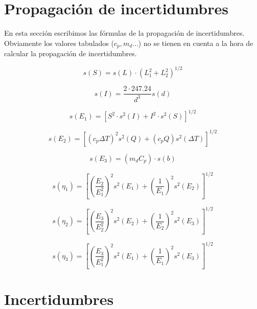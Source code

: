\documentclass[12pt,a4paper]{article}
\newcommand{\parentesis}[1]{\left( #1  \right)}
\newcommand{\ccorchetes}[1]{\left[ #1  \right]}
\begin{document}
\section{Propagación de incertidumbres}
En esta sección escribimos las fórmulas de la propagación de incertidumbres.  Obviamente los valores tabulados ($c_p,m_{d}\ldots$) no se tienen en cuenta a la hora de calcular la propagación de incertidumbres.

\begin{equation}
s(S) = s(L) \cdot \parentesis{L_1^2 + L_2^2}^{1/2}
\end{equation}

\begin{equation}
s(I) = \dfrac{2 \cdot 247.24}{d^3} s(d)
\end{equation}

\begin{equation}
s(E_1) = \ccorchetes{S^2 \cdot s^2(I) + I^2 \cdot s^2(S)}^{1/2}
\end{equation}


\begin{equation}
s(E_2) = \ccorchetes{ (c_p \Delta T)^2 s^2(Q)+(c_p Q) s^2(\Delta T)}^{1/2}
\end{equation}

\begin{equation}
s(E_3) = (m_d C_p) \cdot s(b)
\end{equation}

\begin{equation}
s(\eta_1) = \ccorchetes{ \parentesis{\dfrac{E_2}{E_1^2}}^2 s^2(E_1) + \parentesis{\dfrac{1}{E_1}}^2 s^2(E_2) }^{1/2}
\end{equation}



\begin{equation}
s(\eta_2) = \ccorchetes{ \parentesis{\dfrac{E_3}{E_2^2}}^2 s^2(E_2) + \parentesis{\dfrac{1}{E_2}}^2 s^2(E_3) }^{1/2}
\end{equation}



\begin{equation}
s(\eta_3) = \ccorchetes{ \parentesis{\dfrac{E_3}{E_1^2}}^2 s^2(E_1) + \parentesis{\dfrac{1}{E_1}}^2 s^2(E_3) }^{1/2}
\end{equation}


\newpage

\section{Incertidumbres}
\end{document}
